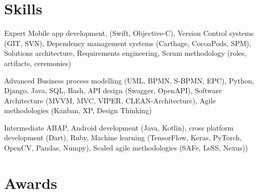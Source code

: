 \documentclass[]{friggeri-cv} %
\begin{document}

\section{Skills}

\begin{entrylist}
	
	
	\smallentry
	{Expert}
	{Mobile app development, (Swift, Objective-C), Version Control systems (GIT, SVN), Dependency management systems (Carthage, CocoaPods, SPM), Solutions architecture, Requirements engineering, Scrum methodology (roles, artifacts, ceremonies)}
	
	
	\smallentry
	{Advanced}
	{Business process modelling (UML, BPMN, S-BPMN, EPC), Python, Django, Java, SQL, Bash, API design (Swagger, OpenAPI), Software Architecture (MVVM, MVC, VIPER, CLEAN-Architecture), Agile methodologies (Kanban, XP, Design Thinking)}
	
	
	\smallentry
	{Intermediate}
	{ABAP, Android development (Java, Kotlin), cross platform development (Dart), Ruby, Machine learning (TensorFlow, Keras, PyTorch, OpenCV, Pandas, Numpy), Scaled agile methodologies (SAFe, LeSS, Nexus))}
	
	
\end{entrylist}

\pagebreak


\section{Awards}
\end{document}
